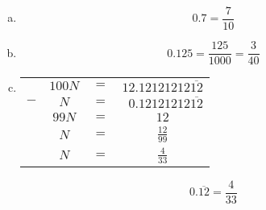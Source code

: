 \documentclass[11pt,letterpaper]{article}
\begin{document}
\sol
\begin{enumerate}[(a)]
\item 
	\[
	0.7= \dfrac{7}{10}
	\] \pspace

\item 
	\[
	0.125= \dfrac{125}{1000}= \dfrac{3}{40}
	\] \pspace

\item \phantom{.}\par
	\begin{table}[!ht]
	\centering\small
	\begin{tabular}{rccc}
	& $100N$ & $=$ & $12.12121212\overline{12}$ \\ 
	$-$ & $N$ & $=$ & $\phantom{2}0.12121212\overline{12}$ \\ \hline
	& $99N$ & $=$ & $12$ \\[0.1cm]
	& $N$ & $=$ & $\frac{12}{99}$ \\[0.1cm]
	& $N$ & $=$ & $\frac{4}{33}$
	\end{tabular}
	\end{table} \par

	\[
	0.\overline{12}= \dfrac{4}{33}
	\] 
\end{enumerate}
\end{document}
